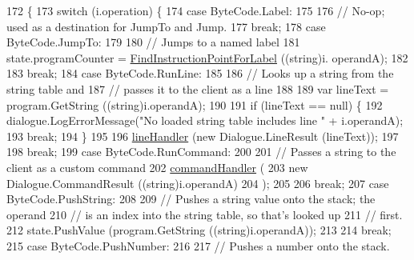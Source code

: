 \begin{DoxyCode}
172                                                     \{
173             \textcolor{keywordflow}{switch} (i.operation) \{
174             \textcolor{keywordflow}{case} ByteCode.Label:
175 
176                 \textcolor{comment}{// No-op; used as a destination for JumpTo and Jump.}
177                 \textcolor{keywordflow}{break};
178             \textcolor{keywordflow}{case} ByteCode.JumpTo:
179 
180                 \textcolor{comment}{// Jumps to a named label}
181                 state.programCounter = \hyperlink{a00138_af613c8b2d098678b6ea05b509c0a0cb6}{FindInstructionPointForLabel} ((\textcolor{keywordtype}{string})i.
      operandA);
182 
183                 \textcolor{keywordflow}{break};
184             \textcolor{keywordflow}{case} ByteCode.RunLine:
185 
186                 \textcolor{comment}{// Looks up a string from the string table and}
187                 \textcolor{comment}{// passes it to the client as a line}
188 
189                 var lineText = program.GetString ((string)i.operandA);
190 
191                 \textcolor{keywordflow}{if} (lineText == null) \{
192                     dialogue.LogErrorMessage(\textcolor{stringliteral}{"No loaded string table includes line "} + i.operandA);
193                     \textcolor{keywordflow}{break};
194                 \}
195 
196                 \hyperlink{a00138_a29b30454f068fc7e107d48bff4346fd9}{lineHandler} (\textcolor{keyword}{new} Dialogue.LineResult (lineText));
197 
198                 \textcolor{keywordflow}{break};
199             \textcolor{keywordflow}{case} ByteCode.RunCommand:
200 
201                 \textcolor{comment}{// Passes a string to the client as a custom command}
202                 \hyperlink{a00138_ab89b02227b92c74552f719afd47848e4}{commandHandler} (
203                     \textcolor{keyword}{new} Dialogue.CommandResult ((\textcolor{keywordtype}{string})i.operandA)
204                 );
205 
206                 \textcolor{keywordflow}{break};
207             \textcolor{keywordflow}{case} ByteCode.PushString:
208 
209                 \textcolor{comment}{// Pushes a string value onto the stack; the operand}
210                 \textcolor{comment}{// is an index into the string table, so that's looked up}
211                 \textcolor{comment}{// first.}
212                 state.PushValue (program.GetString ((string)i.operandA));
213 
214                 \textcolor{keywordflow}{break};
215             \textcolor{keywordflow}{case} ByteCode.PushNumber:
216 
217                 \textcolor{comment}{// Pushes a number onto the stack.}

\end{DoxyCode}
